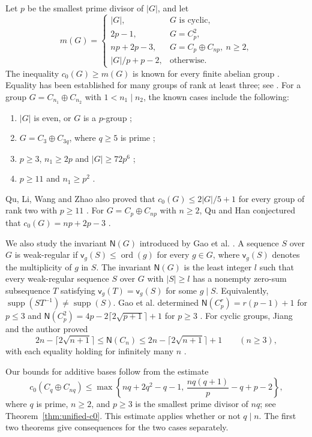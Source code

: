 \documentclass[10pt,a4paper]{amsart}
\theoremstyle{definition}
\theoremstyle{remark}
\numberwithin{equation}{section}
\DeclareMathOperator{\ord}{ord}
\DeclareMathOperator{\supp}{supp}
\begin{document}
Let $p$ be the smallest prime divisor of $|G|$, and let
\[
m(G)=
\begin{cases}
|G|,&G\text{ is cyclic},\\
2p-1,&G=C_p^2,\\
np+2p-3,&G=C_p\oplus C_{np},\ n\ge2,\\
|G|/p+p-2,&\text{otherwise}.
\end{cases}
\]
The inequality $c_0(G)\ge m(G)$ is known for every finite abelian group
\cite[Lemma~2.3]{[GQZ2020]}. Equality has been established for many
groups of rank at least three; see \cite{[GHQQZ2015],[GQZ2020]}.
For a group $G=C_{n_1}\oplus C_{n_2}$ with $1<n_1\mid n_2$,
the known cases include the following:
\begin{enumerate}
\item $|G|$ is even, or $G$ is a $p$-group
      \cite{[GHQQZ2015],[QH2017]};
\item $G=C_3\oplus C_{3q}$, where $q\ge5$ is prime
      \cite{[QL2022]};
\item $p\ge3$, $n_1\ge2p$ and $|G|\ge72p^6$
      \cite{[GLQW2022]};
\item $p\ge11$ and $n_1\ge p^2$
      \cite{[QLWZ2025]}.
\end{enumerate}
Qu, Li, Wang and Zhao also proved that $c_0(G)\le2|G|/5+1$ for
every group of rank two with $p\ge11$
\cite[Lemma~7]{[QLWZ2025]}.
For $G=C_p\oplus C_{np}$ with $n\ge2$, Qu and Han conjectured
that $c_0(G)=np+2p-3$ \cite[Concluding Remark]{[QH2017]}.

We also study the invariant $\mathsf N(G)$ introduced by Gao et al.
\cite{[GHHLYZ2022-1]}. A sequence $S$ over $G$ is weak-regular if
$\mathsf v_g(S)\le\ord(g)$ for every $g\in G$, where $\mathsf v_g(S)$
denotes the multiplicity of $g$ in $S$.
The invariant $\mathsf N(G)$ is the least integer $l$ such that every
weak-regular sequence $S$ over $G$ with $|S|\ge l$ has a nonempty
zero-sum subsequence $T$ satisfying $\mathsf v_g(T)=\mathsf v_g(S)$
for some $g\mid S$. Equivalently, $\supp(ST^{-1})\ne\supp(S)$.
Gao et al. determined
$\mathsf N(C_p^r)=r(p-1)+1$ for $p\le3$ and
$\mathsf N(C_p^2)=4p-2\lceil2\sqrt{p+1}\rceil+1$ for $p\ge3$
\cite[Theorem~1.3]{[GHHLYZ2022-2]}.
For cyclic groups, Jiang and the author proved
\[
2n-\lceil2\sqrt{n+1}\rceil
\le\mathsf N(C_n)
\le2n-\lceil2\sqrt{n+1}\rceil+1
\qquad(n\ge3),
\]
with each equality holding for infinitely many $n$
\cite[Theorem~1.1]{[JY2024]}.

Our bounds for additive bases follow from the estimate
\[
c_0(C_q\oplus C_{nq})\le
\max\left\{nq+2q^2-q-1,\,
\frac{nq(q+1)}p-q+p-2\right\},
\]
where $q$ is prime, $n\ge2$, and $p\ge3$ is the smallest prime
divisor of $nq$; see Theorem~\ref{thm:unified-c0}.
This estimate applies whether or not $q\mid n$.
The first two theorems give consequences for the two cases separately.
\end{document}
